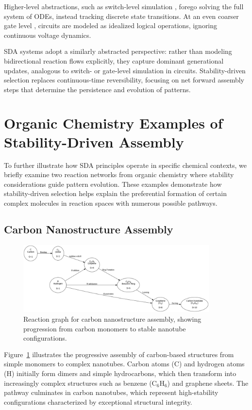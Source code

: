 \documentclass[preprint,12pt]{elsarticle}
\begin{document}
Higher-level abstractions, such as switch-level simulation \cite{AdlerCAD}, forego solving the full system of ODEs, instead tracking discrete state transitions. At an even coarser gate level \cite{FeynmanComp}, circuits are modeled as idealized logical operations, ignoring continuous voltage dynamics.

SDA systems adopt a similarly abstracted perspective: rather than modeling bidirectional reaction flows explicitly, they capture dominant generational updates, analogous to switch- or gate-level simulation in circuits. Stability-driven selection replaces continuous-time reversibility, focusing on net forward assembly steps that determine the persistence and evolution of patterns.

\section{Organic Chemistry Examples of Stability-Driven Assembly}
\label{sec:organic-sda-examples}

To further illustrate how SDA principles operate in specific chemical contexts, we briefly examine two reaction networks from organic chemistry where stability considerations guide pattern evolution. These examples demonstrate how stability-driven selection helps explain the preferential formation of certain complex molecules in reaction spaces with numerous possible pathways.

\subsection{Carbon Nanostructure Assembly}

\begin{figure}[h]
    \centering
    \includegraphics[width=0.9\textwidth]{figure_7.png}
    \caption{Reaction graph for carbon nanostructure assembly, showing progression from carbon monomers to stable nanotube configurations.}
    \label{fig:figure_7}
\end{figure}

Figure~\ref{fig:figure_7} illustrates the progressive assembly of carbon-based structures from simple monomers to complex nanotubes. Carbon atoms (\( \text{C} \)) and hydrogen atoms (\( \text{H} \)) initially form dimers and simple hydrocarbons, which then transform into increasingly complex structures such as benzene (\( \text{C}_6\text{H}_6 \)) and graphene sheets. The pathway culminates in carbon nanotubes, which represent high-stability configurations characterized by exceptional structural integrity.
\end{document}
